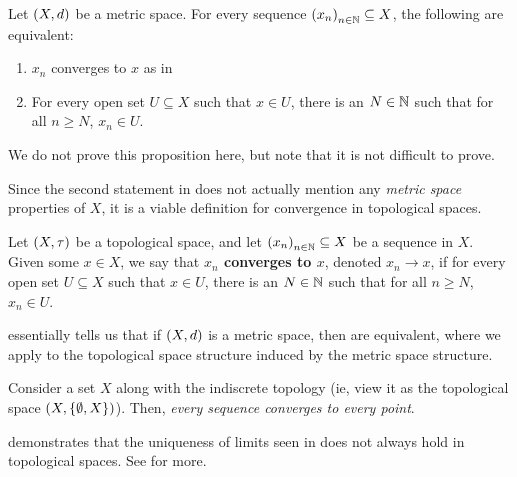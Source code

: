 \begin{boxproposition}\label{Ch1:Prop:Convergence_Metric_Topological}
    Let $\left( X, d \right)$ be a metric space. For every sequence $\left( x_n \right)_{n \in \mathbb{N}} \subseteq X$, the following are equivalent:
    \begin{enumerate}[label = \normalfont \arabic*.]
        \item $x_n$ converges to $x$ as in 
        \item For every open set $U \subseteq X$ such that $x \in U$, there is an $N \in \mathbb{N}$ such that for all $n \geq N$, $x_n \in U$.
    \end{enumerate}
\end{boxproposition}

We do not prove this proposition here, but note that it is not difficult to prove.

Since the second statement in  does not actually mention any \textit{metric space} properties of $X$, it is a viable definition for convergence in topological spaces.

\begin{boxdefinition}\label{Ch1:Def:Convergence_Topological}
    Let $\left( X, \tau \right)$ be a topological space, and let $\left( x_n \right)_{n \in \mathbb{N}} \subseteq X$ be a sequence in $X$. Given some $x \in X$, we say that \textbf{$x_n$ converges to $x$}, denoted $x_n \to x$, if for every open set $U \subseteq X$ such that $x \in U$, there is an $N \in \mathbb{N}$ such that for all $n \geq N$, $x_n \in U$.
\end{boxdefinition}

 essentially tells us that if $\left( X, d \right)$ is a metric space, then  are equivalent, where we apply  to the topological space structure induced by the metric space structure.

\begin{boxexample}\label{Ch1:Eg:Indiscrete_Top_not_Hausdorff}
    Consider a set $X$ along with the indiscrete topology (ie, view it as the topological space $\left( X, \left\{ \emptyset, X \right\} \right)$). Then, \textit{every sequence converges to every point}.
\end{boxexample}

 demonstrates that the uniqueness of limits seen in  does not always hold in topological spaces. See  for more.

